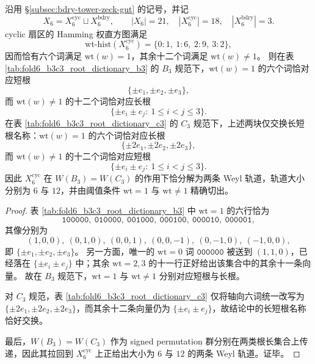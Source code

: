 \begin{theorem}\label{thm:window6-cyclic-weight-threshold-root-length}
沿用 \S\ref{subsec:bdry-tower-zeck-gut} 的记号，并记
\[
X_6=X_6^{\mathrm{cyc}}\sqcup X_6^{\mathrm{bdry}},
\qquad
|X_6|=21,\quad |X_6^{\mathrm{cyc}}|=18,\quad |X_6^{\mathrm{bdry}}|=3.
\]
cyclic 扇区的 Hamming 权直方图满足
\[
\mathrm{wt}\text{-hist}(X_6^{\mathrm{cyc}})=\{0:1,\ 1:6,\ 2:9,\ 3:2\},
\]
因而恰有六个词满足 \(\mathrm{wt}(w)=1\)，其余十二个词满足 \(\mathrm{wt}(w)\neq 1\)。
则在表 \ref{tab:fold6_b3c3_root_dictionary_b3} 的 \(B_3\) 规范下，\(\mathrm{wt}(w)=1\) 的六个词恰对应短根
\[
\{\pm e_1,\pm e_2,\pm e_3\},
\]
而 \(\mathrm{wt}(w)\neq 1\) 的十二个词恰对应长根
\[
\{\pm e_i\pm e_j:\ 1\le i<j\le 3\}.
\]
在表 \ref{tab:fold6_b3c3_root_dictionary_c3} 的 \(C_3\) 规范下，上述两块仅交换长短根名称：\(\mathrm{wt}(w)=1\) 的六个词恰对应长根
\[
\{\pm 2e_1,\pm 2e_2,\pm 2e_3\},
\]
而 \(\mathrm{wt}(w)\neq 1\) 的十二个词恰对应短根
\[
\{\pm e_i\pm e_j:\ 1\le i<j\le 3\}.
\]
因此 \(X_6^{\mathrm{cyc}}\) 在 \(W(B_3)=W(C_3)\) 的作用下恰分解为两条 Weyl 轨道，轨道大小分别为 \(6\) 与 \(12\)，并由阈值条件 \(\mathrm{wt}=1\) 与 \(\mathrm{wt}\neq 1\) 精确切出。
\end{theorem}
\begin{proof}
表 \ref{tab:fold6_b3c3_root_dictionary_b3} 中 \(\mathrm{wt}=1\) 的六行恰为
\[
\texttt{100000},\ \texttt{010000},\ \texttt{001000},\ \texttt{000100},\ \texttt{000010},\ \texttt{000001},
\]
其像分别为
\[
(1,0,0),\ (0,1,0),\ (0,0,1),\ (0,0,-1),\ (0,-1,0),\ (-1,0,0),
\]
即 \(\{\pm e_1,\pm e_2,\pm e_3\}\)。
另一方面，唯一的 \(\mathrm{wt}=0\) 词 \(\texttt{000000}\) 被送到 \((1,1,0)\)，已经落在
\(\{\pm e_i\pm e_j\}\) 中；其余 \(\mathrm{wt}=2,3\) 的十一行正好给出该集合中的其余十一条向量。
故在 \(B_3\) 规范下，\(\mathrm{wt}=1\) 与 \(\mathrm{wt}\neq 1\) 分别对应短根与长根。

对 \(C_3\) 规范，表 \ref{tab:fold6_b3c3_root_dictionary_c3} 仅将轴向六词统一改写为
\(\{\pm 2e_1,\pm 2e_2,\pm 2e_3\}\)，而其余十二条向量仍为 \(\{\pm e_i\pm e_j\}\)，故结论中的长短根名称恰好交换。

最后，\(W(B_3)=W(C_3)\) 作为 signed permutation 群分别在两类根长集合上传递，因此其拉回到 \(X_6^{\mathrm{cyc}}\) 上正给出大小为 \(6\) 与 \(12\) 的两条 Weyl 轨道。证毕。
\end{proof}

